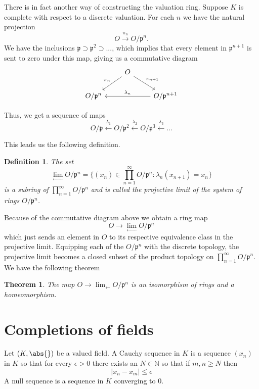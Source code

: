 \documentclass{article}
\newtheorem{theorem}{Theorem}[section]
\newtheorem{definition}{Definition}[section]
\newcommand{\mfrak}[1]{\mathfrak{#1}}
\newcommand{\mbb}[1]{\mathbb{#1}}
\begin{document}
There is in fact another way of constructing the valuation ring. Suppose $K$ is complete with respect to a discrete valuation. For each $n$ we have the natural projection 
$$O \xrightarrow{\pi_n} O / \mfrak p^n.$$ 
We have the inclusions $\mfrak p \supset \mfrak p^2 \supset ...$, which implies that every element in $\mfrak p^{n+1}$ is sent to zero under this map, giving us a commutative diagram
$$\begin{tikzcd}
    & O \arrow[ld, "\pi_{n}"'] \arrow[rd, "\pi_{n+1}"] & \\
    O / \mfrak p^{n} & & O / \mfrak p^{n+1} \arrow[ll, "\lambda_{n}"']
\end{tikzcd}$$


Thus, we get a sequence of maps 
$$O / \mfrak p \xleftarrow {\lambda_1} O / \mfrak p^2 \xleftarrow {\lambda_2} O / \mfrak p^3 \xleftarrow {\lambda_3} ...$$

This leads us the following definition.
\begin{definition}
    The set
    $$\lim_{\leftarrow} O / \mfrak p^n = \{ (x_n) \in \prod_{n=1}^\infty O / \mfrak p^n : \lambda_n(x_{n+1}) = x_n \}$$
    is a subring of $\prod_{n=1}^\infty O / \mfrak p^n$ and is called the projective limit of the system of rings $O / \mfrak p^n$.
\end{definition}

Because of the commutative diagram above we obtain a ring map 
$$O \to \lim_{\leftarrow} O / \mfrak p^n$$
which just sends an element in $O$ to its respective equivalence class in the projective limit. Equipping each of the $O / \mfrak p^n$ with the discrete topology, the projective limit becomes a closed subset of the product topology on $\prod_{n=1}^\infty O / \mfrak p^n$. We have the following theorem

\begin{theorem}
    The map $O \to \lim_{\leftarrow} O / \mfrak p^n$ is an isomorphism of rings and a homeomorphism.
\end{theorem}


\section{Completions of fields}
Let $(K, \abs{})$ be a valued field. A Cauchy sequence in $K$ is a sequence $(x_n)$ in $K$ so that for every $\epsilon > 0$ there exists an $N \in \mbb N$ so that if $m,n \geq N$ then 
$$|x_n - x_m| \leq \epsilon$$
A null sequence is a sequence in $K$ converging to 0. 
\end{document}
